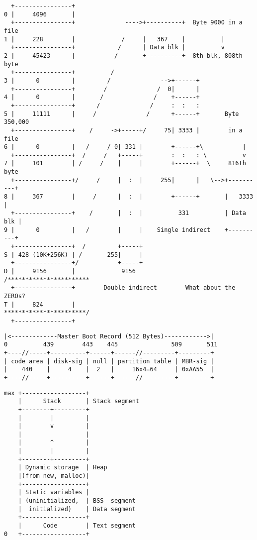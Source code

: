 \documentclass[varwidth,crop,multi={verbatim}]{standalone}
\begin{document}
\begin{verbatim}
  +----------------+
0 |     4096       |
  +----------------+              ---->+----------+  Byte 9000 in a file
1 |     228        |             /     |   367    |          |
  +----------------+            /      | Data blk |          v
2 |     45423      |           /       +----------+  8th blk, 808th byte
  +----------------+          /
3 |      0         |         /              -->+------+
  +----------------+        /              /  0|      |
4 |      0         |       /              /    +------+
  +----------------+      /              /     :  :   :
5 |     11111      |     /              /      +------+       Byte 350,000
  +----------------+    /     ->+-----+/     75| 3333 |        in a file
6 |      0         |   /     / 0| 331 |        +------+\           |
  +----------------+  /     /   +-----+        :  :   : \          v
7 |     101        | /     /    |     |        +------+  \     816th byte
  +----------------+/     /     |  :  |     255|      |   \-->+----------+
8 |     367        |     /      |  :  |        +------+       |   3333   |
  +----------------+    /       |  :  |          331          | Data blk |
9 |      0         |   /        |     |    Single indirect    +----------+
  +----------------+  /         +-----+
S | 428 (10K+256K) | /       255|     |
  +----------------+/           +-----+
D |     9156       |             9156            /***********************
  +----------------+        Double indirect        What about the ZEROs?
T |     824        |                              ***********************/
  +----------------+
\end{verbatim}

\begin{verbatim}
|<-------------Master Boot Record (512 Bytes)------------>|
0          439        443    445               509       511
+----//-----+----------+------+------//---------+---------+
| code area | disk-sig | null | partition table | MBR-sig |  
|    440    |     4    |  2   |     16x4=64     | 0xAA55  |
+----//-----+----------+------+------//---------+---------+
\end{verbatim}

\begin{verbatim}
max +------------------+
    |      Stack       | Stack segment
    +--------+---------+    
    |        |         |
    |        v         |
    |                  |
    |        ^         |
    |        |         |
    +--------+---------+
    | Dynamic storage  | Heap
    |(from new, malloc)|
    +------------------+
    | Static variables | 
    | (uninitialized,  | BSS  segment
    |  initialized)    | Data segment
    +------------------+
    |      Code        | Text segment
0   +------------------+
\end{verbatim}
\end{document}

